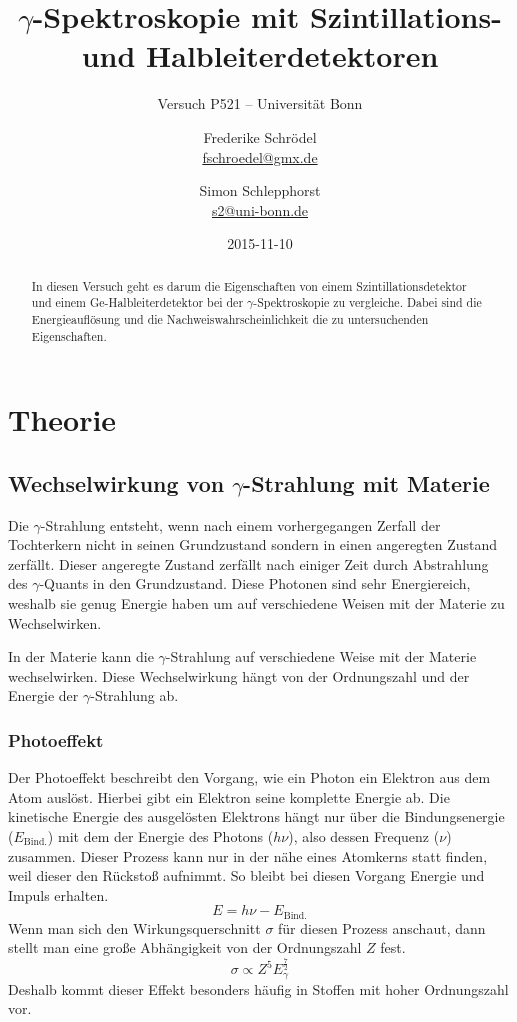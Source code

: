 \documentclass[11pt, ngerman, fleqn, DIV=15, headinclude, BCOR=2cm]{scrreprt}
\title{$\gamma$-Spektroskopie mit Szintillations- und Halbleiterdetektoren}
\subtitle{Versuch P521 -- Universität Bonn}
\author{
	Frederike Schrödel \\
	\small{\href{mailto:fschroedel@gmx.de}{fschroedel@gmx.de}}
	\and
	Simon Schlepphorst \\
	\small{\href{mailto:s2@uni-bonn.de}{s2@uni-bonn.de}}
}
\date{2015-11-10}
\begin{document}
\maketitle

\begin{abstract}
In diesen Versuch geht es darum die Eigenschaften von einem
Szintillationsdetektor und einem Ge-Halbleiterdetektor bei der
$\gamma$-Spektroskopie zu vergleiche.
Dabei sind die Energieauflösung und die Nachweiswahrscheinlichkeit die
zu untersuchenden Eigenschaften.
\end{abstract}


\tableofcontents

\chapter{Theorie}

\section{Wechselwirkung von $\gamma$-Strahlung mit Materie}
Die $\gamma$-Strahlung entsteht, wenn nach einem vorhergegangen Zerfall der
Tochterkern nicht in seinen Grundzustand sondern in einen angeregten Zustand
zerfällt.
Dieser angeregte Zustand zerfällt nach einiger Zeit durch Abstrahlung des
$\gamma$-Quants in den Grundzustand. Diese Photonen sind sehr Energiereich,
weshalb sie genug Energie haben um auf verschiedene Weisen mit der Materie zu
Wechselwirken.

In der Materie kann die $\gamma$-Strahlung auf verschiedene Weise mit der
Materie wechselwirken. 
Diese Wechselwirkung hängt von der Ordnungszahl und der Energie der
$\gamma$-Strahlung ab.

\subsection{Photoeffekt}
Der Photoeffekt beschreibt den Vorgang, wie ein Photon ein Elektron aus dem
Atom auslöst. 
Hierbei gibt ein Elektron seine komplette Energie ab.
Die kinetische Energie des ausgelösten Elektrons hängt nur über die
Bindungsenergie ($E_\text{Bind.}$) mit dem der Energie des Photons ($h\nu$), also dessen Frequenz ($\nu$) zusammen.
Dieser Prozess kann nur in der nähe eines Atomkerns statt finden, weil dieser
den Rückstoß aufnimmt.
So bleibt bei diesen Vorgang Energie und Impuls erhalten. 
\[ 
    E = h\nu - E_\text{Bind.}
\]
Wenn man sich den Wirkungsquerschnitt $\sigma$ für diesen Prozess anschaut,
dann stellt man eine große Abhängigkeit von der Ordnungszahl $Z$ fest.
\[
    \sigma \propto Z^5 E_\gamma^{\frac 72}
\]
Deshalb kommt dieser Effekt besonders häufig in Stoffen mit hoher Ordnungszahl
vor.
\end{document}
